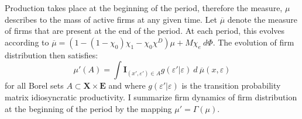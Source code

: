 \documentclass[12pt]{article}
\begin{document}
 \noindent Production takes place at the beginning of the period, therefore the measure, $\mu$ describes to the mass of active firms at any given time. Let $\overline{\mu}$ denote the measure of firms that are present at the end of the period. At each period, this evolves according to $ \overline{\mu} = (1-(1-\chi_0)\chi_1-\chi_0\chi^D) \mu + M \chi_{e} \ d \Phi$. The evolution of firm distribution then satisfies:
\begin{equation} \label{eq_firmdim} 
    \mu'(A) = \int \mathbf{I}_{(x', \varepsilon') \in A} g(\varepsilon'|\varepsilon) \ d \  \overline{\mu} (x,\varepsilon)
\end{equation}
for all Borel sets $A \subset  \mathbf{X} \times \mathbf{E} $ and where $g(\varepsilon'|\varepsilon)$ is the transition probability matrix idiosyncratic productivity. I summarize firm dynamics of firm distribution at the beginning of the period by the mapping $ \mu' =\Gamma(\mu)$.
\end{document}
